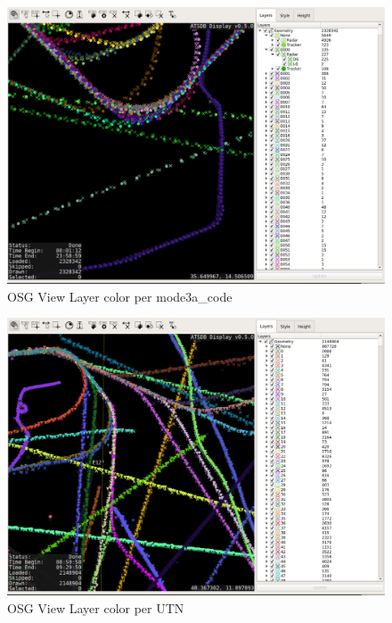 \begin{figure}[H]
    \hspace*{-2.5cm}
    \includegraphics[width=19cm,frame]{../screenshots/osgview_style_mode3a_code.png}
  \caption{OSG View Layer color per mode3a\_code}
\end{figure}

\begin{figure}[H]
    \hspace*{-2.5cm}
    \includegraphics[width=19cm,frame]{../screenshots/osgview_style_utn.png}
  \caption{OSG View Layer color per UTN}
\end{figure}

